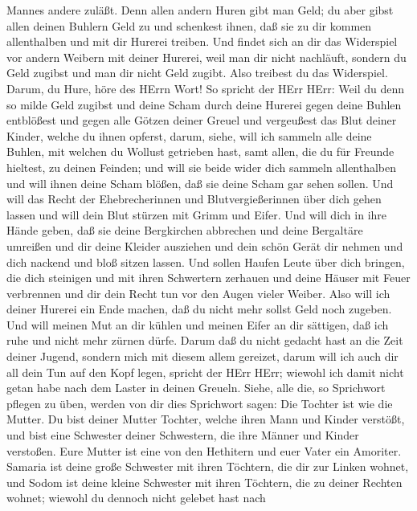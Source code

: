 Mannes andere zuläßt.  Denn allen andern Huren gibt man
Geld; du aber gibst allen deinen Buhlern Geld zu und schenkest ihnen,
daß sie zu dir kommen allenthalben und mit dir Hurerei treiben.
 Und findet sich an dir das Widerspiel vor andern Weibern
mit deiner Hurerei, weil man dir nicht nachläuft, sondern du Geld
zugibst und man dir nicht Geld zugibt. Also treibest du das Widerspiel.
 Darum, du Hure, höre des HErrn Wort!  So
spricht der HErr HErr: Weil du denn so milde Geld zugibst und deine
Scham durch deine Hurerei gegen deine Buhlen entblößest und gegen alle
Götzen deiner Greuel und vergeußest das Blut deiner Kinder, welche du
ihnen opferst,  darum, siehe, will ich sammeln alle deine
Buhlen, mit welchen du Wollust getrieben hast, samt allen, die du für
Freunde hieltest, zu deinen Feinden; und will sie beide wider dich
sammeln allenthalben und will ihnen deine Scham blößen, daß sie deine
Scham gar sehen sollen.  Und will das Recht der
Ehebrecherinnen und Blutvergießerinnen über dich gehen lassen und will
dein Blut stürzen mit Grimm und Eifer.  Und will dich in
ihre Hände geben, daß sie deine Bergkirchen abbrechen und deine
Bergaltäre umreißen und dir deine Kleider ausziehen und dein schön Gerät
dir nehmen und dich nackend und bloß sitzen lassen.  Und
sollen Haufen Leute über dich bringen, die dich steinigen und mit ihren
Schwertern zerhauen  und deine Häuser mit Feuer verbrennen
und dir dein Recht tun vor den Augen vieler Weiber. Also will ich deiner
Hurerei ein Ende machen, daß du nicht mehr sollst Geld noch zugeben.
 Und will meinen Mut an dir kühlen und meinen Eifer an dir
sättigen, daß ich ruhe und nicht mehr zürnen dürfe.  Darum
daß du nicht gedacht hast an die Zeit deiner Jugend, sondern mich mit
diesem allem gereizet, darum will ich auch dir all dein Tun auf den Kopf
legen, spricht der HErr HErr; wiewohl ich damit nicht getan habe nach
dem Laster in deinen Greueln.  Siehe, alle die, so
Sprichwort pflegen zu üben, werden von dir dies Sprichwort sagen: Die
Tochter ist wie die Mutter.  Du bist deiner Mutter Tochter,
welche ihren Mann und Kinder verstößt, und bist eine Schwester deiner
Schwestern, die ihre Männer und Kinder verstoßen. Eure Mutter ist eine
von den Hethitern und euer Vater ein Amoriter.  Samaria ist
deine große Schwester mit ihren Töchtern, die dir zur Linken wohnet, und
Sodom ist deine kleine Schwester mit ihren Töchtern, die zu deiner
Rechten wohnet;  wiewohl du dennoch nicht gelebet hast nach
